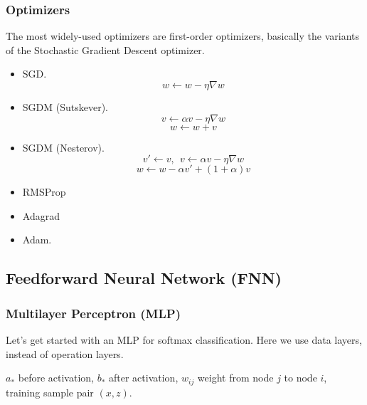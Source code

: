  \subsubsection{Optimizers}

 The most widely-used optimizers are first-order optimizers, basically
 the variants of the Stochastic Gradient Descent optimizer.

 \begin{itemize}
  \item SGD.
$$w \leftarrow w - \eta \nabla w$$
  \item SGDM (Sutskever).
$$v \leftarrow \alpha v - \eta \nabla w$$
$$w \leftarrow w + v$$
  \item SGDM (Nesterov).
$$v' \leftarrow v,~~v \leftarrow \alpha v - \eta \nabla w$$
$$w \leftarrow w - \alpha v' + (1+\alpha)v$$
  \item RMSProp
  \item Adagrad
  \item Adam.
 \end{itemize}

\subsection{Feedforward Neural Network (FNN)}

\subsubsection{Multilayer Perceptron (MLP)}

 Let's get started with an MLP for softmax classification.
 Here we use data layers, instead of operation layers.

 $a_\ast$ before activation, $b_\ast$ after activation,
 $w_{ij}$ weight from node $j$ to node $i$,
 training sample pair $(x,z)$.

